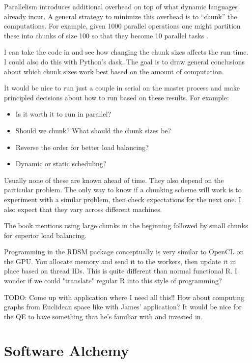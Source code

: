 \documentclass[12pt]{article}
\begin{document}
Parallelism introduces additional overhead on top of what dynamic languages
already incur. A general strategy to minimize this overhead is to ``chunk''
the computations. For example, given 1000 parallel operations one might
partition these into chunks of size 100 so that they become 10 parallel
tasks \cite{matloff2015parallel}.

I can take the code in \cite{matloff2015parallel} and see how changing the
chunk sizes affects the run time. I could also do this with Python's dask.
The goal is to draw general conclusions about which chunk sizes work best
based on the amount of computation.

It would be nice to run just a couple in serial on the master process and
make principled decisions about how to run based on these results. For
example:
\begin{itemize}
    \item Is it worth it to run in parallel?
    \item Should we chunk? What should the chunk sizes be?
    \item Reverse the order for better load balancing?
    \item Dynamic or static scheduling?
\end{itemize}

Usually none of these are known ahead of time.  They also depend on the
particular problem.  The only way to know if a chunking scheme will work is
to experiment with a similar problem, then check expectations for the next
one. I also expect that they vary across different machines.

The book mentions using large chunks in the beginning followed by small
chunks for superior load balancing.

Programming in the RDSM package conceptually is very similar to OpenCL on
the GPU. You allocate memory and send it to the workers, then update it in
place based on thread IDs. This is quite different than normal functional
R. I wonder if we could "translate" regular R into this style of
programming?

TODO: Come up with application where I need all this!! How about computing
graphs from Euclidean space like with James' application? It would be nice
for the QE to have something that he's familiar with and invested in.

\section{Software Alchemy}
\end{document}

